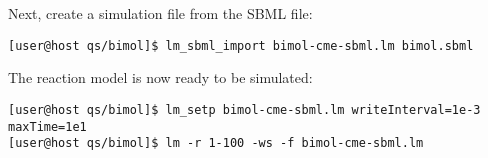 Next, create a simulation file from the SBML file:
{\small\begin{verbatim}
[user@host qs/bimol]$ lm_sbml_import bimol-cme-sbml.lm bimol.sbml
\end{verbatim}}

The reaction model is now ready to be simulated:
{\small\begin{verbatim}
[user@host qs/bimol]$ lm_setp bimol-cme-sbml.lm writeInterval=1e-3 maxTime=1e1
[user@host qs/bimol]$ lm -r 1-100 -ws -f bimol-cme-sbml.lm
\end{verbatim}}

